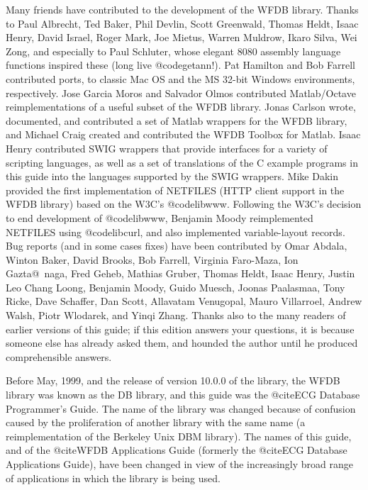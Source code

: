 Many friends have contributed to the development of the WFDB library.  Thanks
to Paul Albrecht, Ted Baker, Phil Devlin, Scott Greenwald, Thomas Heldt, Isaac
Henry, David Israel, Roger Mark, Joe Mietus, Warren Muldrow, Ikaro Silva, Wei
Zong, and especially to Paul Schluter, whose elegant 8080 assembly language
functions inspired these (long live @code{getann}!).  Pat Hamilton and Bob
Farrell contributed ports, to classic Mac OS and the MS 32-bit Windows
environments, respectively.  Jose Garcia Moros and Salvador Olmos contributed
Matlab/Octave reimplementations of a useful subset of the WFDB library.  Jonas
Carlson wrote, documented, and contributed a set of Matlab wrappers for the
WFDB library, and Michael Craig created and contributed the WFDB Toolbox for
Matlab.  Isaac Henry contributed SWIG wrappers that provide interfaces for a
variety of scripting languages, as well as a set of translations of the C
example programs in this guide into the languages supported by the SWIG
wrappers.  Mike Dakin provided the first implementation of NETFILES (HTTP
client support in the WFDB library) based on the W3C's @code{libwww}.
Following the W3C's decision to end development of @code{libwww}, Benjamin
Moody reimplemented NETFILES using @code{libcurl}, and also implemented
variable-layout records.  Bug reports (and in some cases fixes) have been
contributed by Omar Abdala, Winton Baker, David Brooks, Bob Farrell, Virginia
Faro-Maza, Ion Gazta@~naga, Fred Geheb, Mathias Gruber, Thomas Heldt, Isaac
Henry, Justin Leo Chang Loong, Benjamin Moody, Guido Muesch, Joonas Paalasmaa,
Tony Ricke, Dave Schaffer, Dan Scott, Allavatam Venugopal, Mauro Villarroel,
Andrew Walsh, Piotr Wlodarek, and Yinqi Zhang.  Thanks also to the many readers
of earlier versions of this guide; if this edition answers your questions, it
is because someone else has already asked them, and hounded the author until he
produced comprehensible answers.

Before May, 1999, and the release of version 10.0.0 of the library, the
WFDB library was known as the DB library, and this guide was the @cite{ECG
Database Programmer's Guide}.  The name of the library was changed because
of confusion caused by the proliferation of another library with
the same name (a reimplementation of the Berkeley Unix DBM library).
The names of this guide, and of the @cite{WFDB Applications Guide} (formerly
the @cite{ECG Database Applications Guide}), have been changed in view of
the increasingly broad range of applications in which the library is being
used.

